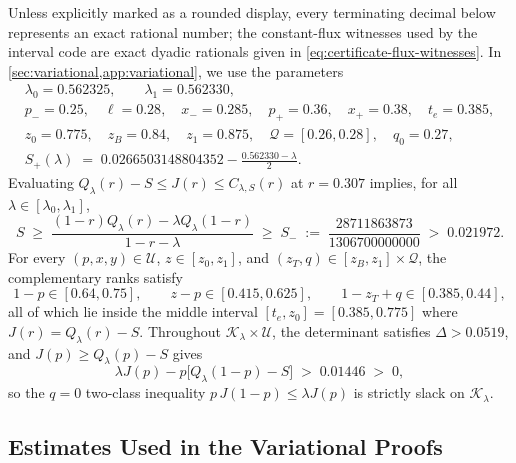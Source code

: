 \documentclass[11pt]{article}
\numberwithin{equation}{section}
\theoremstyle{plain}
\theoremstyle{definition}
\newcommand{\1}{\mathbf{1}}
\newcommand{\calK}{\mathcal{K}}
\newcommand{\calQ}{\mathcal{Q}}
\newcommand{\calU}{\mathcal{U}}
\begin{document}
Unless explicitly marked as a rounded display, every terminating decimal below represents an exact rational number; the constant-flux witnesses used by the interval code are exact dyadic rationals given in \cref{eq:certificate-flux-witnesses}. In \cref{sec:variational,app:variational}, we use the parameters
\[
  \begin{gathered}
    \lambda_0 = 0.562325, \qquad \lambda_1 = 0.562330, \\
    p_- = 0.25, \quad \ell = 0.28, \quad x_- = 0.285, \quad p_+ = 0.36, \quad x_+ = 0.38, \quad t_e = 0.385, \\
    z_0 = 0.775, \quad z_B = 0.84, \quad z_1 = 0.875, \quad \calQ = [0.26, 0.28], \quad q_0 = 0.27, \\
    S_+(\lambda) \;=\; 0.0266503148804352 - \frac{0.562330 - \lambda}{2}.
  \end{gathered}
\]
Evaluating $Q_\lambda(r) - S \le J(r) \le C_{\lambda, S}(r)$ at $r = 0.307$ implies, for all $\lambda \in [\lambda_0, \lambda_1]$,
\[
  S \;\ge\; \frac{(1 - r)Q_\lambda(r) - \lambda Q_\lambda(1 - r)}{1 - r - \lambda} \;\ge\; S_- \;:=\; \frac{28711863873}{1306700000000} \;>\; 0.021972.
\]
For every $(p, x, y) \in \calU$, $z \in [z_0, z_1]$, and $(z_T, q) \in [z_B, z_1] \times \calQ$, the complementary ranks satisfy
\[
  1 - p \in [0.64, 0.75],
  \qquad
  z - p \in [0.415, 0.625],
  \qquad
  1 - z_T + q \in [0.385, 0.44],
\]
all of which lie inside the middle interval $[t_e, z_0] = [0.385, 0.775]$ where $J(r) = Q_\lambda(r) - S$. Throughout $\calK_\lambda \times \calU$, the determinant satisfies $\Delta > 0.0519$, and $J(p) \ge Q_\lambda(p) - S$ gives
\[
  \lambda J(p) - p\bigl[Q_\lambda(1 - p) - S\bigr] \;>\; 0.01446 \;>\; 0,
\]
so the $q = 0$ two-class inequality $p\,J(1 - p) \le \lambda J(p)$ is strictly slack on $\calK_\lambda$.

\subsection{Estimates Used in the Variational Proofs}
\label{app:variational-estimates}
\end{document}
